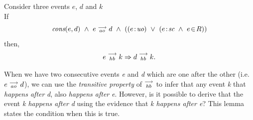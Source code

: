 
\begin{lemma}
    \label{Lemma2}
    Consider three events $e$, $d$ and $k$ \\

    If
        \[
            \cons{e}{d} \ \wedge \ \reln{e}{ao}{d} \ \wedge \
            (
                (\et{e}{uo}) \ \vee \
                (\et{e}{sc} \ \wedge \ \event{e}{R})
            )
        \]   
    then,
        \[
            e\stackrel{\longrightarrow}{_{hb}}k \Rightarrow d\stackrel{\longrightarrow}{_{hb}}k.
        \]

    When we have two consecutive events \textit{e} and \textit{d} which are one after the other (i.e. $e\stackrel{\longrightarrow}{_{ao}}d$), we can use the \textit{transitive property} of $\stackrel{\longrightarrow}{_{hb}}$ to infer that any event \textit{k} that \textit{happens after} \textit{d}, also \textit{happens after} \textit{e}.
    However, is it possible to derive that the event \textit{k happens after d} using the evidence that \textit{k happens after e}? 
    This lemma states the condition when this is true.

\end{lemma}

